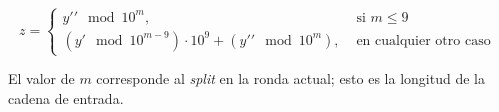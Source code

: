 \begin{equation}
  z =
  \begin{cases}
    y\prime\prime \mod 10^{m}, & \text{ si } m \leq 9 \\
    (y\prime \mod 10^{m - 9}) \cdot 10^{9} + (y\prime\prime \mod 10^{m}),
    & \text{ en cualquier otro caso }
  \end{cases}
\end{equation}

El valor de $ m $ corresponde al \textit{split} en la ronda actual; esto es
la longitud de la cadena de entrada.
